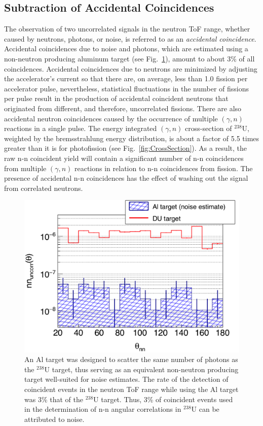 \subsection{Subtraction of Accidental Coincidences}
\label{Reconstruction of Accidental Coincidence}
The observation of two uncorrelated signals in the neutron ToF range, whether caused by neutrons, photons, or noise, is referred to as an \emph{accidental coincidence}.
Accidental coincidences due to noise and photons, which are estimated using a non-neutron producing aluminum target (see Fig.~\ref{fig:Noise}), amount to about 3\% of all coincidences.
Accidental coincidences due to neutrons are minimized by adjusting the accelerator's current so that there are, on average, less than 1.0 fission per accelerator pulse, nevertheless, statistical fluctuations in the number of fissions per pulse result in the production of accidental coincident neutrons that originated from different, and therefore, uncorrelated fissions.
There are also accidental neutron coincidences caused by the occurrence of multiple $(\gamma, n)$ reactions in a single pulse.
The energy integrated $(\gamma, n)$ cross-section of $^{238}$U, weighted by the bremsstrahlung energy distribution, is about a factor of 5.5 times greater than it is for photofission (see Fig.~\ref{fig:CrossSection}).
As a result, the raw n-n coincident yield will contain a significant number of n-n coincidences from multiple $(\gamma, n)$ reactions in relation to n-n coincidences from fission.
The presence of accidental n-n coincidences has the effect of washing out the signal from correlated neutrons. 
\begin{figure}[]
\centering
    \includegraphics[width=\figsize\textwidth]{Noise.png}
    \caption{An Al target was designed to scatter the same number of photons as the $^{238}$U target, thus serving as an equivalent non-neutron producing target well-suited for noise estimates.
    The rate of the detection of coincident events in the neutron ToF range while using the Al target was 3\% that of the $^{238}$U target.
    Thus, 3\% of coincident events used in the determination of n-n angular correlations in $^{238}$U can be attributed to noise.
        }
    \label{fig:Noise}
\end{figure}
